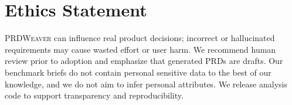 \section*{Ethics Statement}

\textsc{PRDWeaver} can influence real product decisions; incorrect or hallucinated requirements may cause wasted effort or user harm.
We recommend human review prior to adoption and emphasize that generated PRDs are drafts.
Our benchmark briefs do not contain personal sensitive data to the best of our knowledge, and we do not aim to infer personal attributes.
We release analysis code to support transparency and reproducibility.


